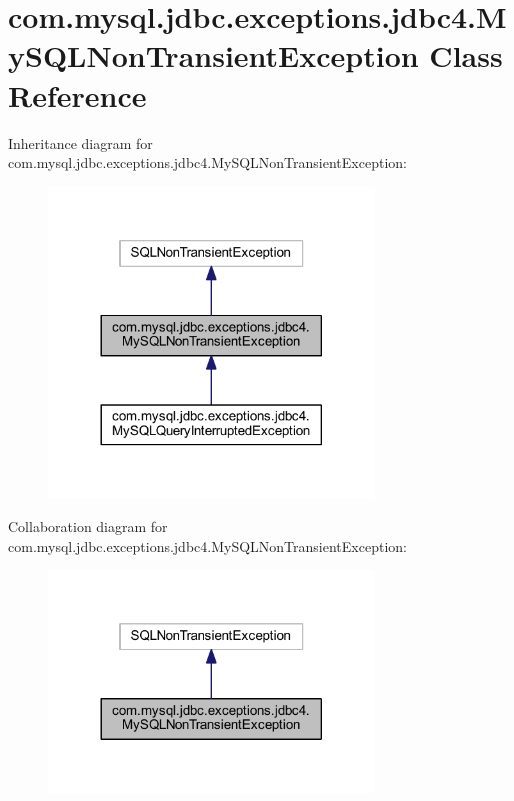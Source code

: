 \hypertarget{classcom_1_1mysql_1_1jdbc_1_1exceptions_1_1jdbc4_1_1_my_s_q_l_non_transient_exception}{}\section{com.\+mysql.\+jdbc.\+exceptions.\+jdbc4.\+My\+S\+Q\+L\+Non\+Transient\+Exception Class Reference}
\label{classcom_1_1mysql_1_1jdbc_1_1exceptions_1_1jdbc4_1_1_my_s_q_l_non_transient_exception}


Inheritance diagram for com.\+mysql.\+jdbc.\+exceptions.\+jdbc4.\+My\+S\+Q\+L\+Non\+Transient\+Exception\+:
\nopagebreak
\begin{figure}[H]
\begin{center}
\leavevmode
\includegraphics[width=245pt]{classcom_1_1mysql_1_1jdbc_1_1exceptions_1_1jdbc4_1_1_my_s_q_l_non_transient_exception__inherit__graph}
\end{center}
\end{figure}


Collaboration diagram for com.\+mysql.\+jdbc.\+exceptions.\+jdbc4.\+My\+S\+Q\+L\+Non\+Transient\+Exception\+:
\nopagebreak
\begin{figure}[H]
\begin{center}
\leavevmode
\includegraphics[width=245pt]{classcom_1_1mysql_1_1jdbc_1_1exceptions_1_1jdbc4_1_1_my_s_q_l_non_transient_exception__coll__graph}
\end{center}
\end{figure}
